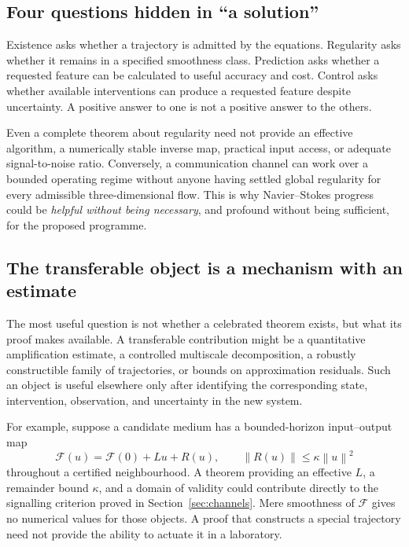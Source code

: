 \documentclass[11pt,a4paper]{article}
\theoremstyle{definition}
\theoremstyle{remark}
\newcommand{\norm}[1]{\left\lVert#1\right\rVert}
\begin{document}
\subsection{Four questions hidden in ``a solution''}
Existence asks whether a trajectory is admitted by the equations. Regularity asks whether it remains in a specified smoothness class. Prediction asks whether a requested feature can be calculated to useful accuracy and cost. Control asks whether available interventions can produce a requested feature despite uncertainty. A positive answer to one is not a positive answer to the others.

Even a complete theorem about regularity need not provide an effective algorithm, a numerically stable inverse map, practical input access, or adequate signal-to-noise ratio. Conversely, a communication channel can work over a bounded operating regime without anyone having settled global regularity for every admissible three-dimensional flow. This is why Navier--Stokes progress could be \emph{helpful without being necessary}, and profound without being sufficient, for the proposed programme.

\subsection{The transferable object is a mechanism with an estimate}
The most useful question is not whether a celebrated theorem exists, but what its proof makes available. A transferable contribution might be a quantitative amplification estimate, a controlled multiscale decomposition, a robustly constructible family of trajectories, or bounds on approximation residuals. Such an object is useful elsewhere only after identifying the corresponding state, intervention, observation, and uncertainty in the new system.

For example, suppose a candidate medium has a bounded-horizon input--output map
\begin{equation}\label{eq:nonlinearIO}
 \mathcal F(u)=\mathcal F(0)+Lu+R(u),\qquad
 \norm{R(u)}\leq \kappa\norm{u}^2
\end{equation}
throughout a certified neighbourhood. A theorem providing an effective $L$, a remainder bound $\kappa$, and a domain of validity could contribute directly to the signalling criterion proved in Section~\ref{sec:channels}. Mere smoothness of $\mathcal F$ gives no numerical values for those objects. A proof that constructs a special trajectory need not provide the ability to actuate it in a laboratory.
\end{document}

